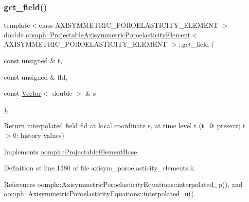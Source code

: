 \mbox{\label{classoomph_1_1ProjectableAxisymmetricPoroelasticityElement_aba62f3460cbd779f3193be8e48fdb636}} 
\subsubsection{\texorpdfstring{get\+\_\+field()}{get\_field()}}
{\footnotesize\ttfamily template$<$class A\+X\+I\+S\+Y\+M\+M\+E\+T\+R\+I\+C\+\_\+\+P\+O\+R\+O\+E\+L\+A\+S\+T\+I\+C\+I\+T\+Y\+\_\+\+E\+L\+E\+M\+E\+NT $>$ \\
double \hyperlink{classoomph_1_1ProjectableAxisymmetricPoroelasticityElement}{oomph\+::\+Projectable\+Axisymmetric\+Poroelasticity\+Element}$<$ A\+X\+I\+S\+Y\+M\+M\+E\+T\+R\+I\+C\+\_\+\+P\+O\+R\+O\+E\+L\+A\+S\+T\+I\+C\+I\+T\+Y\+\_\+\+E\+L\+E\+M\+E\+NT $>$\+::get\+\_\+field (\begin{DoxyParamCaption}\item[{const unsigned \&}]{t,  }\item[{const unsigned \&}]{fld,  }\item[{const \hyperlink{classoomph_1_1Vector}{Vector}$<$ double $>$ \&}]{s }\end{DoxyParamCaption})\hspace{0.3cm}{\ttfamily [inline]}, {\ttfamily [virtual]}}



Return interpolated field fld at local coordinate s, at time level t (t=0\+: present; t$>$0\+: history values) 



Implements \hyperlink{classoomph_1_1ProjectableElementBase_ae4da5b565b6d333be2f5920f7be763cd}{oomph\+::\+Projectable\+Element\+Base}.



Definition at line 1580 of file axisym\+\_\+poroelasticity\+\_\+elements.\+h.



References oomph\+::\+Axisymmetric\+Poroelasticity\+Equations\+::interpolated\+\_\+p(), and oomph\+::\+Axisymmetric\+Poroelasticity\+Equations\+::interpolated\+\_\+u().

\mbox{\label{classoomph_1_1ProjectableAxisymmetricPoroelasticityElement_a53a88c81a5225e213ca869e670ad1605}} 
